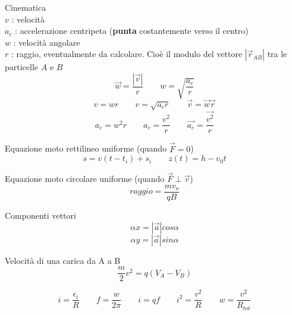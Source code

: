 \documentclass[14pt]{extarticle}
\begin{document}
Cinematica\\
$v$ : velocità\\
$a_c$ : accelerazione centripeta (\textbf{punta} costantemente verso il centro)\\
$w$ : velocità angolare\\
$r$ : raggio, eventualmente da calcolare. Cioè il modulo del vettore $|\overrightarrow{r}_{AB}|$  tra le particelle $A$ e $B$
\begin{equation*}
    \overrightarrow{w}=\frac{\left | \overrightarrow v \right |}{r}
    \quad\quad
    w=\sqrt{\frac{a_c}{r}}
\end{equation*}
\begin{equation*}
    v=wr
    \quad\quad
    v=\sqrt{a_cr}
    \quad\quad
    \overrightarrow{v}=\overrightarrow{w}\overrightarrow{r}
\end{equation*}
\begin{equation*}
    a_c=w^2r
    \quad\quad
    a_c=\frac{v^2}{r}
    \quad\quad
    \overrightarrow{a_c}=\frac{\overrightarrow{v^2}}{r}
\end{equation*}


Equazione moto rettilineo uniforme (quando $\overrightarrow{F}=0$)
\begin{equation*}
    s=v(t-t_i)+s_i
    \quad\quad
    z(t)=h-v_0t
\end{equation*}

Equazione moto circolare uniforme (quando $\overrightarrow{F}\perp\overrightarrow{v}$)
\begin{equation*}
    raggio = \frac{mv_o}{qB}
\end{equation*}

Componenti vettori
\begin{equation*}
    \alpha x= \left | \overrightarrow{a} \right |cos\alpha
\end{equation*}
\begin{equation*}
    \alpha y= \left | \overrightarrow{a} \right |sin\alpha
\end{equation*}

Velocità di una carica da A a B
\begin{equation*}
    \frac{m}{2}v^2=q(V_A-V_B)
\end{equation*}

\begin{equation*}
    i=\frac{\epsilon_i}{R}
    \quad\quad
    f=\frac{w}{2\pi}
    \quad\quad
    i=qf
    \quad\quad
    i^2=\frac{v^2}{R}
    \quad\quad
    w=\frac{v^2}{R_{tot}}
\end{equation*}
\end{document}

